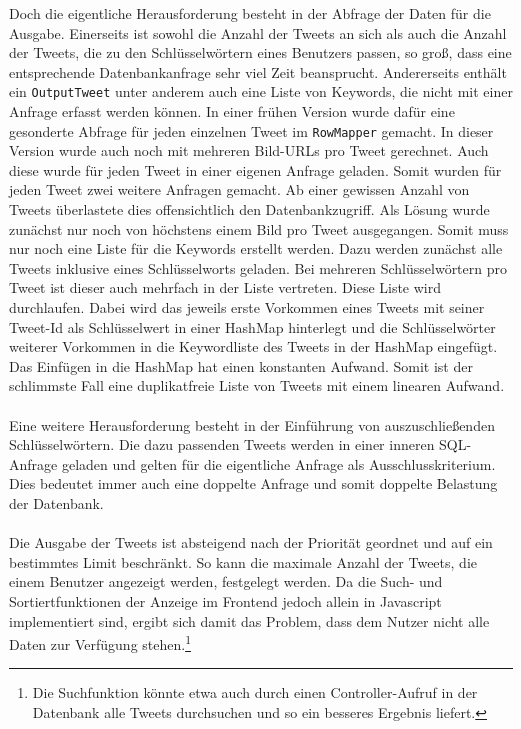 Doch die eigentliche Herausforderung besteht in der Abfrage der Daten für die Ausgabe. Einerseits ist 
sowohl die Anzahl der Tweets an sich als auch die Anzahl der Tweets, die zu den Schlüsselwörtern eines 
Benutzers passen, so groß, dass eine entsprechende Datenbankanfrage sehr viel Zeit beansprucht. 
Andererseits enthält ein \texttt{OutputTweet} unter anderem auch eine Liste von Keywords, die nicht mit einer 
Anfrage erfasst werden können.
In einer frühen Version wurde dafür eine gesonderte Abfrage für jeden einzelnen Tweet im \texttt{RowMapper} 
gemacht. In dieser Version wurde auch noch mit mehreren Bild-URLs pro Tweet gerechnet. Auch diese wurde 
für jeden Tweet in einer eigenen Anfrage geladen. Somit wurden für jeden Tweet zwei weitere Anfragen 
gemacht. Ab einer gewissen Anzahl von Tweets überlastete dies offensichtlich den Datenbankzugriff.
Als Lösung wurde zunächst nur noch von höchstens einem Bild pro Tweet ausgegangen. Somit muss nur noch 
eine Liste für die Keywords erstellt werden. Dazu werden zunächst alle Tweets inklusive eines 
Schlüsselworts geladen. Bei mehreren Schlüsselwörtern pro Tweet ist dieser auch mehrfach in der Liste 
vertreten. Diese Liste wird durchlaufen. Dabei wird das jeweils erste Vorkommen eines Tweets mit seiner 
Tweet-Id als Schlüsselwert in einer HashMap hinterlegt und die Schlüsselwörter weiterer Vorkommen in die 
Keywordliste des Tweets in der HashMap eingefügt. Das Einfügen in die HashMap hat einen konstanten 
Aufwand. Somit ist der schlimmste Fall eine duplikatfreie Liste von Tweets mit einem linearen Aufwand.
\\\\
Eine weitere Herausforderung besteht in der Einführung von auszuschließenden Schlüsselwörtern. Die dazu 
passenden Tweets werden in einer inneren SQL-Anfrage geladen und gelten für die eigentliche Anfrage als 
Ausschlusskriterium. Dies bedeutet immer auch eine doppelte Anfrage und somit doppelte Belastung der 
Datenbank.
\\\\
Die Ausgabe der Tweets ist absteigend nach der Priorität geordnet und auf ein bestimmtes Limit beschränkt. 
So kann die maximale Anzahl der Tweets, die einem Benutzer angezeigt werden, festgelegt werden. Da die 
Such- und Sortiertfunktionen der Anzeige im Frontend jedoch allein in Javascript implementiert sind, 
ergibt sich damit das Problem, dass dem Nutzer nicht alle Daten zur Verfügung stehen.\footnote{Die Suchfunktion könnte etwa auch durch einen Controller-Aufruf in der Datenbank alle Tweets durchsuchen und so ein besseres Ergebnis liefert.}








